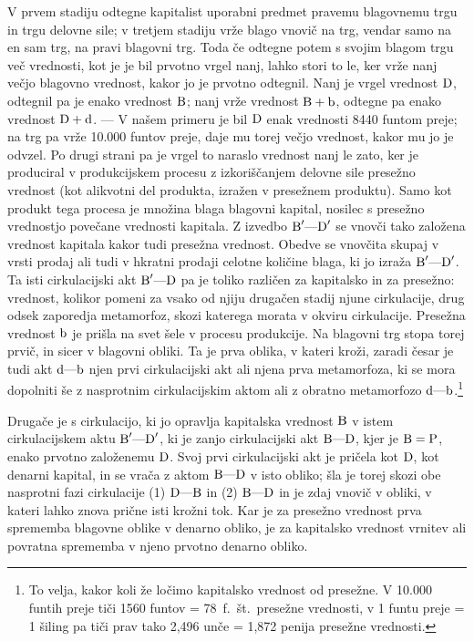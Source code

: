 \documentclass[kapital_02.tex]{subfiles}
\begin{document}
V prvem stadiju odtegne kapitalist uporabni predmet pravemu blagovnemu trgu in trgu delovne sile; v tretjem stadiju vrže blago vnovič na trg, vendar samo na en sam trg, na pravi blagovni trg. Toda če odtegne potem s svojim blagom trgu več vrednosti, kot je je bil prvotno vrgel nanj, lahko stori to le, ker vrže nanj večjo blagovno vrednost, kakor jo je prvotno odtegnil. Nanj je vrgel vrednost \( \textrm{D} \), odtegnil pa je enako vrednost \( \textrm{B} \); nanj vrže vrednost \( \textrm{B} + \textrm{b} \), odtegne pa enako vrednost \( \textrm{D} + \textrm{d} \). --- V našem primeru je bil \( \textrm{D} \) enak vrednosti 8440 funtom preje; na trg pa vrže 10.000 funtov preje, daje mu torej večjo vrednost, kakor mu jo je odvzel. Po drugi strani pa je vrgel to naraslo vrednost nanj le zato, ker je produciral v produkcijskem procesu z izkoriščanjem delovne sile presežno vrednost (kot alikvotni del produkta, izražen v presežnem produktu). Samo kot produkt tega procesa je množina blaga blagovni kapital, nosilec s presežno vrednostjo povečane vrednosti kapitala. Z izvedbo \( \textrm{B}'\textrm{---}\textrm{D}' \) se vnovči tako založena vrednost kapitala kakor tudi presežna vrednost. Obedve se vnovčita skupaj v vrsti prodaj ali tudi v hkratni prodaji celotne količine blaga, ki jo izraža \( \textrm{B}'\textrm{---}\textrm{D}' \). Ta isti cirkulacijski akt \( \textrm{B}'\textrm{---}\textrm{D} \) pa je toliko različen za kapitalsko in za presežno: vrednost, kolikor pomeni za vsako od njiju drugačen stadij njune cirkulacije, drug odsek zaporedja metamorfoz, skozi katerega morata v okviru cirkulacije. Presežna vrednost \( \textrm{b} \) je prišla na svet šele v procesu produkcije. Na blagovni trg stopa torej prvič, in sicer v blagovni obliki. Ta je prva oblika, v kateri kroži, zaradi česar je tudi akt \( \textrm{d}\textrm{---}\textrm{b} \) njen prvi cirkulacijski akt ali njena prva metamorfoza, ki se mora dopolniti še z nasprotnim cirkulacijskim aktom ali z obratno metamorfozo \( \textrm{d}\textrm{---}\textrm{b} \).\footnote{To velja, kakor koli že ločimo kapitalsko vrednost od presežne. V 10.000 funtih preje tiči 1560 funtov = 78~f.~št.\ presežne vrednosti, v 1 funtu preje = 1 šiling pa tiči prav tako 2,496 unče = 1,872 penija presežne vrednosti.}

Drugače je s cirkulacijo, ki jo opravlja kapitalska vrednost \( \textrm{B} \) v istem cirkulacijskem aktu \( \textrm{B}'\textrm{---}\textrm{D}' \), ki je zanjo cirkulacijski akt \( \textrm{B}\textrm{---}\textrm{D} \), kjer je \( \textrm{B} = \textrm{P} \), enako prvotno založenemu \( \textrm{D} \). Svoj prvi cirkulacijski akt je pričela kot \( \textrm{D} \), kot denarni kapital, in se vrača z aktom \( \textrm{B}\textrm{---}\textrm{D} \) v isto obliko; šla je torej skozi obe nasprotni fazi cirkulacije (1) \( \textrm{D}\textrm{---}\textrm{B} \) in (2) \( \textrm{B}\textrm{---}\textrm{D} \) in je zdaj vnovič v obliki, v kateri lahko znova prične isti krožni tok. Kar je za presežno vrednost prva sprememba blagovne oblike v denarno obliko, je za kapitalsko vrednost vrnitev ali povratna sprememba v njeno prvotno denarno obliko.
\end{document}
